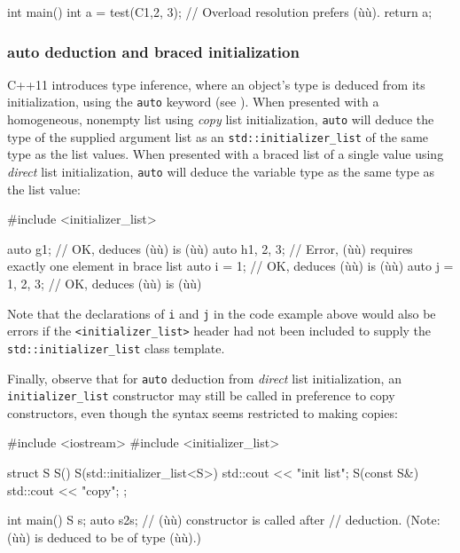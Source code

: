 \begin{emcppslisting}
int main()
{
    int a = test(C{1,2}, 3);  // Overload resolution prefers (ù{}ù).
    return a;
}
\end{emcppslisting}


\subsubsection[\lstinline!auto! deduction and braced initialization]{{\SubsubsecCode auto} deduction and braced initialization}\label{auto-deduction-and-braced-initialization}

C++11 introduces type inference, where an object's type is deduced from
its initialization, using the \lstinline!auto! keyword (see ). When presented with a homogeneous, nonempty list using
\emph{copy} list initialization, \lstinline!auto! will deduce the type of
the supplied argument list as an \lstinline!std::initializer_list! of the
same type as the list values. When presented with a braced list of a
single value using \emph{direct} list initialization, \lstinline!auto! will
deduce the variable type as the same type as the list value:

\begin{emcppslisting}
#include <initializer_list>

auto g{1};         // OK, deduces (ù{}ù) is (ù{}ù)
auto h{1, 2, 3};     // Error, (ù{}ù) requires exactly one element in brace list
auto i = {1};      // OK, deduces (ù{}ù) is (ù{}ù)
auto j = {1, 2, 3};  // OK, deduces (ù{}ù) is (ù{}ù)
\end{emcppslisting}


\noindent Note that the declarations of \lstinline!i! and \lstinline!j! in the code
example above would also be errors if the \lstinline!<initializer_list>!
header had not been included to supply the
\lstinline!std::initializer_list! class template.

Finally, observe that for \lstinline!auto! deduction from \emph{direct}
list initialization, an \lstinline!initializer_list! constructor may still
be called in preference to copy constructors, even though the syntax
seems restricted to making copies:

\begin{emcppslisting}
#include <iostream>
#include <initializer_list>

struct S
{
    S() { }
    S(std::initializer_list<S>) { std::cout << "init list\n";}
    S(const S&) { std::cout << "copy\n";}
};

int main()
{
    S s;
    auto s2{s};  // (ù{}ù) constructor is called after
                 // deduction. (Note: (ù{}ù) is deduced to be of type (ù{}ù).)
}
\end{emcppslisting}


